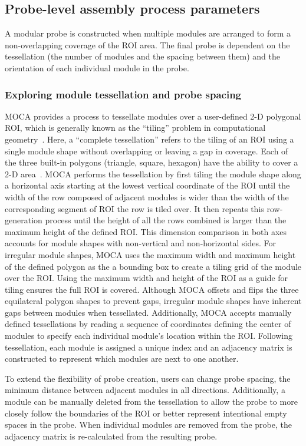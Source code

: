 \subsection{Probe-level assembly process parameters}
A modular probe is constructed when multiple modules are arranged to form a non-overlapping coverage of the ROI area. The final probe is dependent on the tessellation (the number of modules and the spacing between them) and the orientation of each individual module in the probe.

\subsubsection{Exploring module tessellation and probe spacing}
MOCA provides a process to tessellate modules over a user-defined 2-D polygonal ROI, which is generally known as the ``tiling'' problem in computational geometry~\cite{Winslow2015}. Here, a ``complete tessellation'' refers to the tiling of an ROI using a single module shape without overlapping or leaving a gap in coverage. Each of the three built-in polygons (triangle, square, hexagon) have the ability to cover a 2-D area~\cite{Samet1990}. MOCA performs the tessellation by first tiling the module shape along a horizontal axis starting at the lowest vertical coordinate of the ROI until the width of the row composed of adjacent modules is wider than the width of the corresponding segment of ROI the row is tiled over. It then repeats this row-generation process until the height of all the rows combined is larger than the maximum height of the defined ROI. This dimension comparison in both axes accounts for module shapes with non-vertical and non-horizontal sides. For irregular module shapes, MOCA uses the maximum width and maximum height of the defined polygon as the a bounding box to create a tiling grid of the module over the ROI. Using the maximum width and height of the ROI as a guide for tiling ensures the full ROI is covered. Although MOCA offsets and flips the three equilateral polygon shapes to prevent gaps, irregular module shapes have inherent gaps between modules when tessellated. Additionally, MOCA accepts manually defined tessellations by reading a sequence of coordinates defining the center of modules to specify each individual module's location within the ROI. Following tessellation, each module is assigned a unique index and an adjacency matrix is constructed to represent which modules are next to one another.

To extend the flexibility of probe creation, users can change probe spacing, the minimum distance between adjacent modules in all directions. Additionally, a module can be manually deleted from the tessellation to allow the probe to more closely follow the boundaries of the ROI or better represent intentional empty spaces in the probe. When individual modules are removed from the probe, the adjacency matrix is re-calculated from the resulting probe. 

